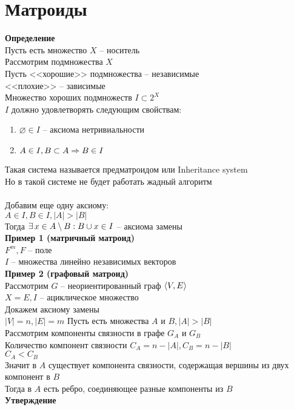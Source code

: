 \documentclass[12pt]{article}
\begin{document}
\section{Матроиды}
\textbf{Определение}\\
Пусть есть множество $X$ -- носитель\\
Рассмотрим подмножества $X$\\
Пусть <<хорошие>> подмножества -- независимые\\
<<плохие>> -- зависимые\\
Множество хороших подмножеств $I \subset 2^X$\\
$I$ должно удовлетворять следующим свойствам:
\begin{enumerate}
    \item $\varnothing \in I$ -- аксиома нетривиальности
    \item $A \in I, B \subset A \Rightarrow B\in I$
\end{enumerate}
Такая система называется предматроидом или Inheritance system\\
Но в такой системе не будет работать жадный алгоритм\\\\
Добавим еще одну аксиому:\\
$A \in I, B\in I, |A| > |B|$\\
Тогда $\exists\, x\in A \setminus B: B \cup x \in I$ -- аксиома замены\\
\textbf{Пример 1 (матричный матроид)}\\
$F^m, F$ -- поле\\
$I$ -- множества линейно независимых векторов\\
\textbf{Пример 2 (графовый матроид)}\\
Рассмотрим $G$ -- неориентированный граф $\langle V, E \rangle$\\
$X = E, I$ -- ациклическое множество\\
Докажем аксиому замены\\
$|V| = n, |E| = m$
Пусть есть множества $A$ и $B, |A| > |B|$\\
Рассмотрим компоненты связности в графе $G_A$ и $G_B$\\
Количество компонент связности $C_A = n - |A|, C_B = n - |B|$\\
$C_A < C_B$\\
Значит в $A$ существует компонента связности, содержащая вершины из двух компонент в $B$\\
Тогда в $A$ есть ребро, соединяющее разные компоненты из $B$\\
\textbf{Утверждение}\\
\end{document}
